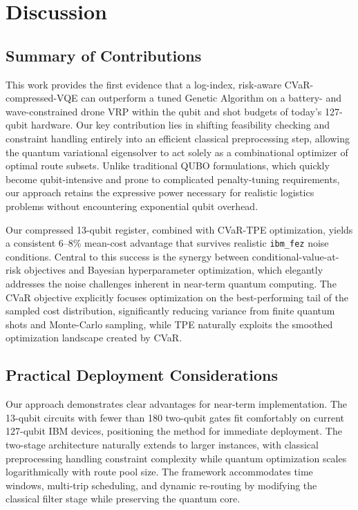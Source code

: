 
\section{Discussion}
\label{sec:discussion}

\subsection{Summary of Contributions}

This work provides the first evidence that a log-index, risk-aware CVaR-compressed-VQE can outperform a tuned Genetic Algorithm on a battery- and wave-constrained drone VRP within the qubit and shot budgets of today's 127-qubit hardware. Our key contribution lies in shifting feasibility checking and constraint handling entirely into an efficient classical preprocessing step, allowing the quantum variational eigensolver to act solely as a combinational optimizer of optimal route subsets. Unlike traditional QUBO formulations, which quickly become qubit-intensive and prone to complicated penalty-tuning requirements, our approach retains the expressive power necessary for realistic logistics problems without encountering exponential qubit overhead.

Our compressed 13-qubit register, combined with CVaR-TPE optimization, yields a consistent 6--8\% mean-cost advantage that survives realistic \texttt{ibm\_fez} noise conditions. Central to this success is the synergy between conditional-value-at-risk objectives and Bayesian hyperparameter optimization, which elegantly addresses the noise challenges inherent in near-term quantum computing. The CVaR objective explicitly focuses optimization on the best-performing tail of the sampled cost distribution, significantly reducing variance from finite quantum shots and Monte-Carlo sampling, while TPE naturally exploits the smoothed optimization landscape created by CVaR.

\subsection{Practical Deployment Considerations}

Our approach demonstrates clear advantages for near-term implementation. The 13-qubit circuits with fewer than 180 two-qubit gates fit comfortably on current 127-qubit IBM devices, positioning the method for immediate deployment. The two-stage architecture naturally extends to larger instances, with classical preprocessing handling constraint complexity while quantum optimization scales logarithmically with route pool size. The framework accommodates time windows, multi-trip scheduling, and dynamic re-routing by modifying the classical filter stage while preserving the quantum core.

